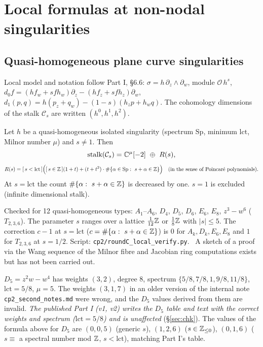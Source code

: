 \section{Local formulas at non-nodal singularities}\label{sec:local2}
\subsection{Quasi-homogeneous plane curve singularities}
Local model and notation follow Part I, \S6.6: $\sigma=h\,\partial_z\wedge\partial_w$, module $\mathcal O\,h^s$, $d_0f=(hf_w+sfh_w)\partial_z-(hf_z+sfh_z)\partial_w$, $d_1(p,q)=h(p_z+q_w)-(1-s)(h_zp+h_wq)$. The cohomology dimensions of the stalk $\mathcal C_s$ are written $(h^0,h^1,h^2)$.

\begin{obs}\label{obs:stalk}
Let $h$ be a quasi-homogeneous isolated singularity (spectrum $\mathrm{Sp}$, minimum $\mathrm{lct}$, Milnor number $\mu$) and $s\ne1$. Then
\[\text{stalk}(\mathcal C_s)=\mathbb C^{\mu}[-2]\ \oplus\ R(s),\]
\[R(s)=[\,s<\mathrm{lct}\,]\Bigl([\,s\in\Z\,](1+t)+(t+t^2)\cdot\#\{\alpha\in\mathrm{Sp}:\ s+\alpha\in\Z\}\Bigr)\quad(\text{in the sense of Poincar\'e polynomials}).\]
At $s=\mathrm{lct}$ the count $\#\{\alpha:\ s+\alpha\in\Z\}$ is decreased by one. $s=1$ is excluded (infinite dimensional stalk).
\end{obs}
Checked for 12 quasi-homogeneous types: $A_1$--$A_6$, $D_4$, $D_5$, $D_6$, $E_6$, $E_8$, $z^3-w^6$ ($T_{2,3,6}$). The parameter $s$ ranges over a lattice $\tfrac1{12}\mathbb Z$ or $\tfrac1{8}\mathbb Z$ with $|s|\le5$. The correction $c-1$ at $s=\mathrm{lct}$ ($c=\#\{\alpha:\ s+\alpha\in\mathbb Z\}$) is $0$ for $A_k,D_k,E_6,E_8$ and $1$ for $T_{2,3,6}$ at $s=1/2$. Script: \texttt{cp2/roundC\_local\_verify.py}. \tK\ A sketch of a proof via the Wang sequence of the Milnor fibre and Jacobian ring computations exists but has not been carried out.

\begin{rem}\label{rem:D5}
$D_5=z^2w-w^4$ has weights $(3,2)$, degree $8$, spectrum $\{5/8,7/8,1,9/8,11/8\}$, $\mathrm{lct}=5/8$, $\mu=5$. The weights $(3,1,7)$ in an older version of the internal note \texttt{cp2\_second\_notes.md} were wrong, and the $D_5$ values derived from them are invalid. \emph{The published Part I (v1, v2) writes the $D_5$ table and text with the correct weights and spectrum ($\mathrm{lct}=5/8$) and is unaffected} (\S\ref{sec:chk}). The values of the formula above for $D_5$ are $(0,0,5)$ (generic $s$), $(1,2,6)$ ($s\in\mathbb Z_{\le0}$), $(0,1,6)$ ($s\equiv$ a spectral number mod $\mathbb Z$, $s<\mathrm{lct}$), matching Part I's table.
\end{rem}

